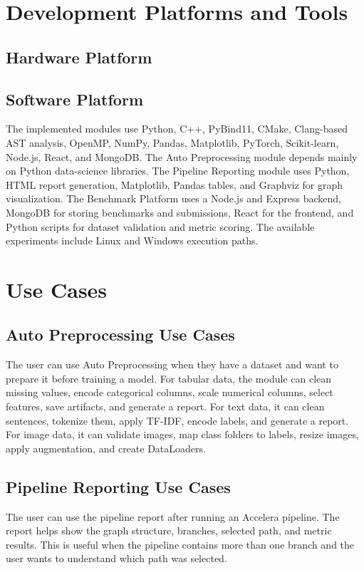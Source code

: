 \documentclass[12pt,a4paper]{report}
\begin{document}
\chapter{Development Platforms and Tools}
\section{Hardware Platform}


\section{Software Platform}
The implemented modules use Python, C++, PyBind11, CMake, Clang-based AST
analysis, OpenMP, NumPy, Pandas, Matplotlib, PyTorch, Scikit-learn, Node.js,
React, and MongoDB. The Auto Preprocessing module depends mainly on Python
data-science libraries. The Pipeline Reporting module uses Python, HTML report
generation, Matplotlib, Pandas tables, and Graphviz for graph visualization.
The Benchmark Platform uses a Node.js and Express backend, MongoDB for storing
benchmarks and submissions, React for the frontend, and Python scripts for
dataset validation and metric scoring. The available experiments include Linux
and Windows execution paths.

\chapter{Use Cases}
\section{Auto Preprocessing Use Cases}
The user can use Auto Preprocessing when they have a dataset and want to
prepare it before training a model. For tabular data, the module can clean
missing values, encode categorical columns, scale numerical columns, select
features, save artifacts, and generate a report. For text data, it can clean
sentences, tokenize them, apply TF-IDF, encode labels, and generate a report.
For image data, it can validate images, map class folders to labels, resize
images, apply augmentation, and create DataLoaders.

\section{Pipeline Reporting Use Cases}
The user can use the pipeline report after running an Accelera pipeline. The
report helps show the graph structure, branches, selected path, and metric
results. This is useful when the pipeline contains more than one branch and the
user wants to understand which path was selected.
\end{document}
